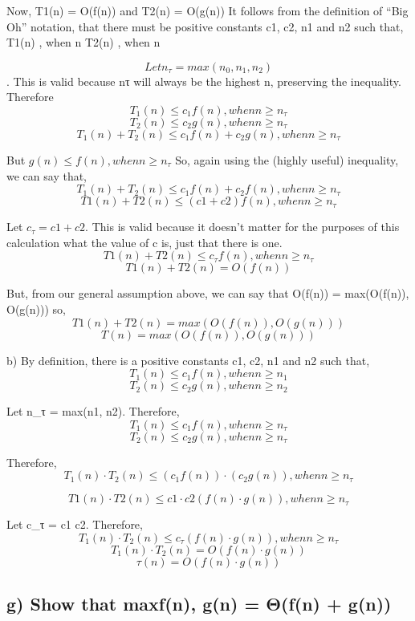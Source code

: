 \documentclass[11pt]{article}
\begin{document}
Now, T1(n) = O(f(n)) and T2(n) = O(g(n)) \newline
It follows from the definition of “Big Oh” notation, that there must be positive constants c1, c2, n1 and n2 such that, \newline
T1(n) , when n  \newline
T2(n) , when n  

\[Let {n_τ} = max({n_0}, {n_1}, {n_2})\].  
This is valid because nτ will always be the highest n, preserving the inequality. Therefore 
\[T_1(n) \leq c_1f(n), when n \geq{n_τ}\] 
\[T_2(n) \leq c_2g(n), when n \geq{n_τ}\] 
\[T_1(n) + T_2(n) \leq c_1f(n) + c_2g(n), when n \geq{n_τ}\] 

But $ g(n) \leq f(n), when n \geq n_τ $
So, again using the (highly useful) inequality, we can say that,
\[ T_1(n) + T_2(n) \leq c_1f(n) + c_2f(n), when n \geq{n_τ} \]
\[T1(n) + T2(n) \leq (c1 + c2)f(n), when n \geq{n_τ} \]

Let ${c_τ} = c1 + c2$. This is valid because it doesn’t matter for the purposes of this calculation what the value of c is, just that there is one.
\[ T1(n) + T2(n) \leq {c_τ} f(n), when n \geq {n_τ} \]
\[T1(n) + T2(n) = O(f(n)) \]

But, from our general assumption above, we can say that O(f(n)) = max(O(f(n)), O(g(n)))
so, 
\[ T1(n) + T2(n) = max(O(f(n)), O(g(n))) \]
\[ T(n) = max(O(f(n)), O(g(n))) \]

b) By definition, there is a  positive constants c1, c2, n1 and n2 such that, 
\[  T_1(n) \leq c_1f (n), when n \geq n_1 \]
\[ T_2(n) \leq c_2g (n), when n \geq n_2 \]

Let {n_τ} = max(n1, n2). Therefore,
\[  T_1(n) \leq c_1f (n), when n \geq {n_τ} \]
\[  T_2(n) \leq c_2g (n), when n \geq {n_τ}  \]

Therefore,
\[ T_1(n) \cdot T_2(n) \leq (c_1f (n)) \cdot (c_2g (n)), when n \geq{n_τ} \]

\[ T1(n) \cdot T2(n) \leq c1 \cdot c2 (f (n) \cdot g (n)), when n\geq{n_τ}  \]

Let {c_τ} = c1 \cdot c2.
Therefore,
\[ T_1(n) \cdot T_2(n) \leq c_τ (f (n) \cdot g (n)), when n \geq {n_τ} \]
\[ T_1(n) \cdot T_2(n) = O (f (n) \cdot g (n)) \]
\[ τ(n) = O(f(n) \cdot g(n)) \]


\subsection{g) Show that max{f(n), g(n)} = Θ(f(n) + g(n)) }
\end{document}
